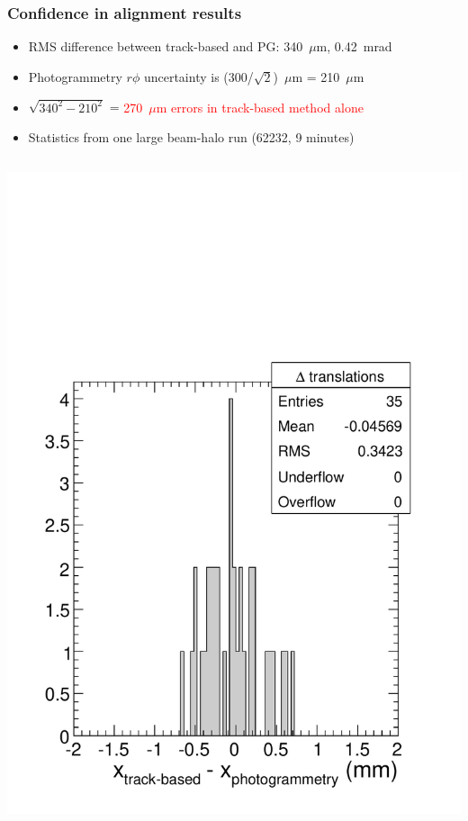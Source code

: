 \documentclass[compress]{beamer}
\begin{document}
\begin{frame}
\frametitle{Confidence in alignment results}
\begin{itemize}
\item RMS difference between track-based and PG: 340~$\mu$m, 0.42~mrad
\item Photogrammetry $r\phi$ uncertainty is (300/$\sqrt{2}$)~$\mu$m = 210~$\mu$m
\item $\sqrt{340^2 - 210^2}$ = \textcolor{red}{270~$\mu$m errors in track-based method alone}
\item Statistics from one large beam-halo run (62232, 9 minutes)
\end{itemize}

\begin{columns}
\includegraphics[width=\linewidth]{delta_translations.pdf}

\end{columns}
\end{frame}
\end{document}

